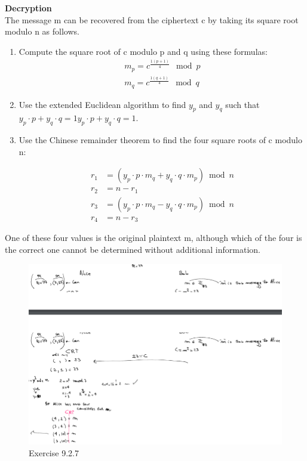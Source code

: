 \documentclass{article}
\begin{document}
\textbf{Decryption}\\
The message m can be recovered from the ciphertext c by taking its square root modulo n as follows.
\begin{enumerate}
\item Compute the square root of c modulo p and q using these formulas:
\begin{align*}
    {m_p=c^\frac{1(p+1)}{4} \mod p}\\
    {m_q=c^\frac{1(q+1)}{4} \mod q}
\end{align*}
\item Use the extended Euclidean algorithm to find $y_{p}$ and $y_{q}$ such that ${\displaystyle y_{p}\cdot p+y_{q}\cdot q=1}y_{p}\cdot p+y_{q}\cdot q=1$.
\item Use the Chinese remainder theorem to find the four square roots of c modulo n:

 \begin{align*}r_{1}&=\left(y_{p}\cdot p\cdot m_{q}+y_{q}\cdot q\cdot m_{p}\right){\bmod {n}}\\r_{2}&=n-r_{1}\\r_{3}&=\left(y_{p}\cdot p\cdot m_{q}-y_{q}\cdot q\cdot m_{p}\right){\bmod {n}}\\r_{4}&=n-r_{3}\end{align*}
\end{enumerate}
One of these four values is the original plaintext m, although which of the four is the correct one cannot be determined without additional information.
\begin{figure}[htb]
	\begin{center}
  		\includegraphics[width=1 \textwidth]{exercise9.2.7.png}
 	\end{center}
 	\caption{Exercise 9.2.7}
 	\label{ciphering}
\end{figure}
\end{document}
